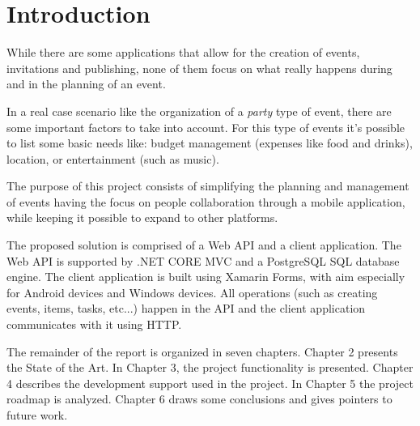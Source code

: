 
\chapter{Introduction} 
\label{ch:Chapter1}
\vfill \minitoc \newpage


While there are some applications that allow for the creation of events, invitations and publishing, none of them focus on what really happens during and in the planning of an event.

In a real case scenario like the organization of a \textit{party} type of event, there are some important factors to take into account. For this type of events it's possible to list some basic needs like: budget management (expenses like food and drinks), location, or entertainment (such as music).

The purpose of this project consists of simplifying the planning and management of events having the focus on people collaboration through a mobile application, while keeping it possible to expand to other platforms.

The proposed solution is comprised of a Web API and a client application. The Web API is supported by .NET CORE MVC and a PostgreSQL SQL database engine. The client application is built using Xamarin Forms, with aim especially for Android devices and Windows devices. All operations (such as creating events, items, tasks, etc...) happen in the API and the client application communicates with it using HTTP.

The remainder of the report is organized in seven chapters. Chapter 2 presents the State of the Art. In Chapter 3, the project functionality is presented. Chapter 4 describes the development support used in the project. In Chapter 5 the project roadmap is analyzed. Chapter 6 draws some conclusions and gives pointers to future work.

